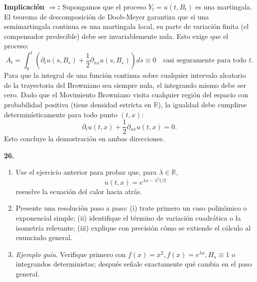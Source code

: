 \documentclass[11pt, letterpaper]{article}
\begin{document}
\begin{solucion}
    \textbf{Implicación $\Longrightarrow$:}
    Supongamos que el proceso $Y_t = u(t, B_t)$ es una martingala.
    El teorema de descomposición de Doob-Meyer garantiza que si una semimartingala continua es una martingala local, su parte de variación finita (el compensador predecible) debe ser invariablemente nula.
    Esto exige que el proceso:
    \[ A_t = \int_0^t \left( \partial_t u(s, B_s) + \frac{1}{2} \partial_{xx} u(s, B_s) \right) ds \equiv 0 \quad \text{casi seguramente para todo } t. \]
    Para que la integral de una función continua sobre cualquier intervalo aleatorio de la trayectoria del Browniano sea siempre nula, el integrando mismo debe ser cero. Dado que el Movimiento Browniano visita cualquier región del espacio con probabilidad positiva (tiene densidad estricta en $\mathbb{R}$), la igualdad debe cumplirse determinísticamente para todo punto $(t,x)$:
    \[ \partial_t u(t,x) + \frac{1}{2}\partial_{xx} u(t,x) = 0. \]
    Esto concluye la demostración en ambas direcciones.
\end{solucion}

\newpage

\begin{ejercicio}
    \textbf{26.} 
    \begin{enumerate}
        \item Use el ejercicio anterior para probar que, para $\lambda \in \mathbb{R}$,
        \[ u(t, x) = e^{\lambda x - \lambda^2 t / 2} \]
        resuelve la ecuación del calor hacia atrás.
        \item Presente una resolución paso a paso: (i) trate primero un caso polinómico o exponencial simple; (ii) identifique el término de variación cuadrática o la isometría relevante; (iii) explique con precisión cómo se extiende el cálculo al enunciado general.
        \item \textit{Ejemplo guía}. Verifique primero con $f(x) = x^2, f(x) = e^{\lambda x}, H_s \equiv 1$ o integrandos deterministas; después señale exactamente qué cambia en el paso general.
    \end{enumerate}
\end{ejercicio}

\vspace{5mm}
\end{document}

